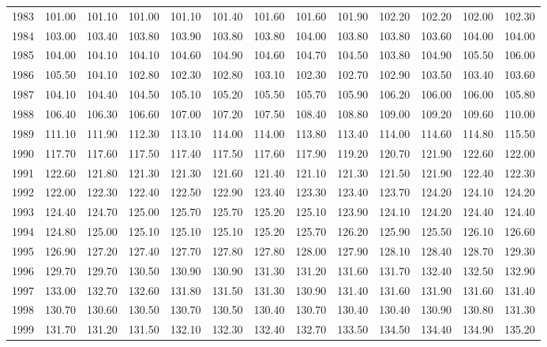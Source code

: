 \begin{longtable}{rrrrrrrrrrrrr}
  1983 & 101.00 & 101.10 & 101.00 & 101.10 & 101.40 & 101.60 & 101.60 & 101.90 & 102.20 & 102.20 & 102.00 & 102.30 \\ 
  1984 & 103.00 & 103.40 & 103.80 & 103.90 & 103.80 & 103.80 & 104.00 & 103.80 & 103.80 & 103.60 & 104.00 & 104.00 \\ 
  1985 & 104.00 & 104.10 & 104.10 & 104.60 & 104.90 & 104.60 & 104.70 & 104.50 & 103.80 & 104.90 & 105.50 & 106.00 \\ 
  1986 & 105.50 & 104.10 & 102.80 & 102.30 & 102.80 & 103.10 & 102.30 & 102.70 & 102.90 & 103.50 & 103.40 & 103.60 \\ 
  1987 & 104.10 & 104.40 & 104.50 & 105.10 & 105.20 & 105.50 & 105.70 & 105.90 & 106.20 & 106.00 & 106.00 & 105.80 \\ 
  1988 & 106.40 & 106.30 & 106.60 & 107.00 & 107.20 & 107.50 & 108.40 & 108.80 & 109.00 & 109.20 & 109.60 & 110.00 \\ 
  1989 & 111.10 & 111.90 & 112.30 & 113.10 & 114.00 & 114.00 & 113.80 & 113.40 & 114.00 & 114.60 & 114.80 & 115.50 \\ 
  1990 & 117.70 & 117.60 & 117.50 & 117.40 & 117.50 & 117.60 & 117.90 & 119.20 & 120.70 & 121.90 & 122.60 & 122.00 \\ 
  1991 & 122.60 & 121.80 & 121.30 & 121.30 & 121.60 & 121.40 & 121.10 & 121.30 & 121.50 & 121.90 & 122.40 & 122.30 \\ 
  1992 & 122.00 & 122.30 & 122.40 & 122.50 & 122.90 & 123.40 & 123.30 & 123.40 & 123.70 & 124.20 & 124.10 & 124.20 \\ 
  1993 & 124.40 & 124.70 & 125.00 & 125.70 & 125.70 & 125.20 & 125.10 & 123.90 & 124.10 & 124.20 & 124.40 & 124.40 \\ 
  1994 & 124.80 & 125.00 & 125.10 & 125.10 & 125.10 & 125.20 & 125.70 & 126.20 & 125.90 & 125.50 & 126.10 & 126.60 \\ 
  1995 & 126.90 & 127.20 & 127.40 & 127.70 & 127.80 & 127.80 & 128.00 & 127.90 & 128.10 & 128.40 & 128.70 & 129.30 \\ 
  1996 & 129.70 & 129.70 & 130.50 & 130.90 & 130.90 & 131.30 & 131.20 & 131.60 & 131.70 & 132.40 & 132.50 & 132.90 \\ 
  1997 & 133.00 & 132.70 & 132.60 & 131.80 & 131.50 & 131.30 & 130.90 & 131.40 & 131.60 & 131.90 & 131.60 & 131.40 \\ 
  1998 & 130.70 & 130.60 & 130.50 & 130.70 & 130.50 & 130.40 & 130.70 & 130.40 & 130.40 & 130.90 & 130.80 & 131.30 \\ 
  1999 & 131.70 & 131.20 & 131.50 & 132.10 & 132.30 & 132.40 & 132.70 & 133.50 & 134.50 & 134.40 & 134.90 & 135.20 \\ 

\end{longtable}
